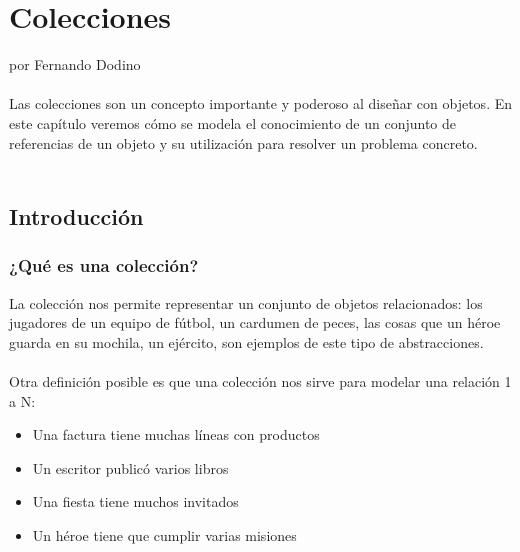 \documentclass[a4paper,12pt]{book}
\begin{document}
\chapter{Colecciones}
por Fernando Dodino
\\
\\
Las colecciones son un concepto importante y poderoso al diseñar con objetos. En este capítulo veremos cómo
se modela el conocimiento de un conjunto de referencias de un objeto y su utilización para resolver un problema
concreto.
\\
\\

\tableofcontents

\newpage

\section{Introducción}

\subsection{¿Qué es una colección?}
La colección nos permite representar un conjunto de objetos relacionados: los jugadores de un equipo de fútbol, 
un cardumen de peces, las cosas que un héroe guarda en su mochila, un ejército, son ejemplos de este
tipo de abstracciones.\\
\\
Otra definición posible es que una colección nos sirve para modelar una relación 1 a N:
\begin{itemize}
\item Una factura tiene muchas líneas con productos
\item Un escritor publicó varios libros
\item Una fiesta tiene muchos invitados
\item Un héroe tiene que cumplir varias misiones
\end{itemize}

\vspace{\baselineskip}
\end{document}
